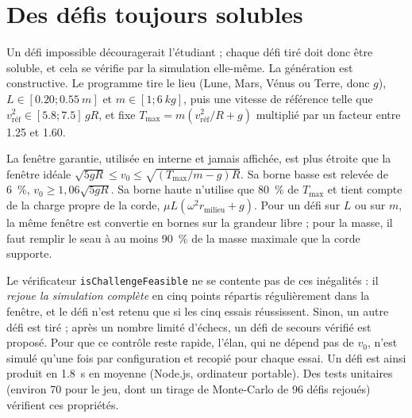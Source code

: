 
\section{Des défis toujours solubles}
\label{sec-defis}

Un défi impossible découragerait l'étudiant ; chaque défi tiré doit donc être
soluble, et cela se vérifie par la simulation elle-même. La génération est
constructive. Le programme tire le lieu (Lune, Mars, Vénus ou Terre, donc
\(g\)), \(L \in [\num{0,20} ; \SI{0,55}{m}]\) et \(m \in [1 ; \SI{6}{kg}]\),
puis une vitesse de référence telle que
\(v_{\text{réf}}^2 \in [\num{5,8} ; \num{7,5}]\, g R\), et fixe
\(T_{\max} = m (v_{\text{réf}}^2/R + g)\) multiplié par un facteur entre
\num{1,25} et \num{1,60}.

La fenêtre garantie, utilisée en interne et jamais affichée, est plus étroite que la fenêtre idéale
\(\sqrt{5 g R} \leq v_0 \leq \sqrt{(T_{\max}/m - g) R}\). Sa borne basse est
relevée de \SI{6}{\percent}, \(v_0 \geq 1{,}06 \sqrt{5 g R}\). Sa borne haute
n'utilise que \SI{80}{\percent} de \(T_{\max}\) et tient compte de la charge
propre de la corde, \(\mu L (\omega^2 r_{\text{milieu}} + g)\). Pour un défi sur
\(L\) ou sur \(m\), la même fenêtre est convertie en bornes sur la grandeur
libre ; pour la masse, il faut remplir le seau à au moins \SI{90}{\percent} de
la masse maximale que la corde supporte.

Le vérificateur \texttt{isChallengeFeasible} ne se contente pas de ces
inégalités : il \emph{rejoue la simulation complète} en cinq points répartis
régulièrement dans la fenêtre, et le défi n'est retenu que si les cinq essais
réussissent. Sinon, un autre défi est tiré ; après un nombre limité d'échecs,
un défi de secours vérifié est proposé. Pour que ce contrôle reste rapide, l'élan,
qui ne dépend pas de \(v_0\), n'est simulé qu'une fois par configuration
et recopié pour chaque essai. Un défi est ainsi produit en \SI{1,8}{s} en
moyenne (Node.js, ordinateur portable). Des tests unitaires (environ 70 pour le
jeu, dont un tirage de Monte-Carlo de 96 défis rejoués) vérifient ces
propriétés.

